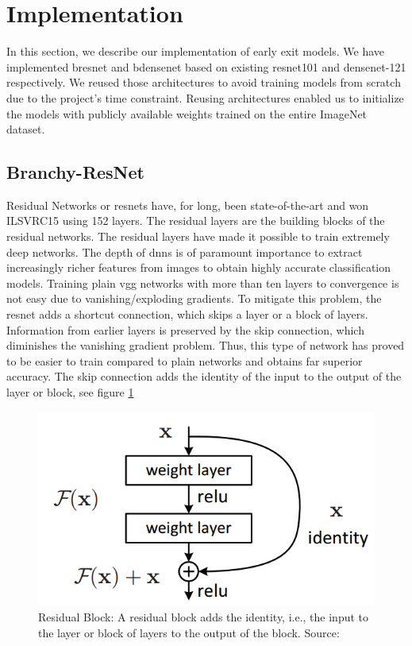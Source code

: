 \section{Implementation} \label{sec:ee-implementation}

In this section, we describe our implementation of early exit models. We have implemented \gls{bresnet} and \gls{bdensenet} based on existing \gls{resnet}101 and \gls{densenet}-121 respectively. We reused those architectures to avoid training models from scratch due to the project's time constraint. Reusing architectures enabled us to initialize the models with publicly available weights trained on the entire ImageNet dataset.

\subsection{Branchy-ResNet} 

Residual Networks or \gls{resnet}s \cite{he_deep_2015} have, for long, been state-of-the-art and won ILSVRC15 using 152 layers. The residual layers are the building blocks of the residual networks. The residual layers have made it possible to train extremely deep networks. The depth of \gls{dnn}s is of paramount importance to extract increasingly richer features from images to obtain highly accurate classification models. Training plain \gls{vgg} networks \cite{simonyan_very_2015} with more than ten layers to convergence is not easy due to vanishing/exploding gradients. To mitigate this problem, the \gls{resnet} adds a shortcut connection, which skips a layer or a block of layers. Information from earlier layers is preserved by the skip connection, which diminishes the vanishing gradient problem. Thus, this type of network has proved to be easier to train compared to plain networks and obtains far superior accuracy. The skip connection adds the identity of the input to the output of the layer or block, see figure \ref{fig:residualblock}

\begin{figure}
	\centering
	\includegraphics[width=.5\linewidth]{figures/models/residualblock}
	\caption[Residual Block]{Residual Block: A residual block adds the identity, i.e., the input to the layer or block of layers to the output of the block. Source:  \cite{he_deep_2015}}
	\label{fig:residualblock}
\end{figure}

